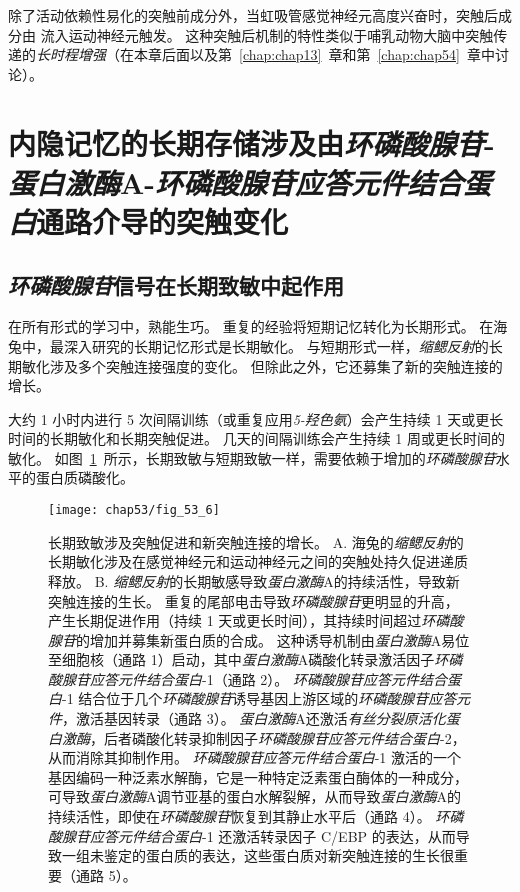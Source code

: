 除了活动依赖性易化的突触前成分外，当虹吸管感觉神经元高度兴奋时，突触后成分由  流入运动神经元触发。
这种突触后机制的特性类似于哺乳动物大脑中突触传递的\textit{长时程增强}（在本章后面以及第~\ref{chap:chap13}~章和第~\ref{chap:chap54}~章中讨论）。



\section{内隐记忆的长期存储涉及由\textit{环磷酸腺苷}-\textit{蛋白激酶}A-\textit{环磷酸腺苷应答元件结合蛋白}通路介导的突触变化}

\subsection{\textit{环磷酸腺苷}信号在长期致敏中起作用}

在所有形式的学习中，熟能生巧。
重复的经验将短期记忆转化为长期形式。
在海兔中，最深入研究的长期记忆形式是长期敏化。
与短期形式一样，\textit{缩鳃反射}的长期敏化涉及多个突触连接强度的变化。
但除此之外，它还募集了新的突触连接的增长。


大约 1 小时内进行 5 次间隔训练（或重复应用\textit{5-羟色氨}）会产生持续 1 天或更长时间的长期敏化和长期突触促进。
几天的间隔训练会产生持续 1 周或更长时间的敏化。
如图~\ref{fig:53_6}~所示，长期致敏与短期致敏一样，需要依赖于增加的\textit{环磷酸腺苷}水平的蛋白质磷酸化。


\begin{figure}[htbp]
	\centering
	\texttt{[image: chap53/fig\_53\_6]}
	\caption{长期致敏涉及突触促进和新突触连接的增长。
		A. 海兔的\textit{缩鳃反射}的长期敏化涉及在感觉神经元和运动神经元之间的突触处持久促进递质释放。
		B. \textit{缩鳃反射}的长期敏感导致\textit{蛋白激酶}A的持续活性，导致新突触连接的生长。
		重复的尾部电击导致\textit{环磷酸腺苷}更明显的升高，产生长期促进作用（持续 1 天或更长时间），其持续时间超过\textit{环磷酸腺苷}的增加并募集新蛋白质的合成。
		这种诱导机制由\textit{蛋白激酶}A易位至细胞核（通路 1）启动，其中\textit{蛋白激酶}A磷酸化转录激活因子\textit{环磷酸腺苷应答元件结合蛋白}-1（通路 2）。
		\textit{环磷酸腺苷应答元件结合蛋白}-1 结合位于几个\textit{环磷酸腺苷}诱导基因上游区域的\textit{环磷酸腺苷应答元件}，激活基因转录（通路 3）。
		\textit{蛋白激酶}A还激活\textit{有丝分裂原活化蛋白激酶}，后者磷酸化转录抑制因子\textit{环磷酸腺苷应答元件结合蛋白}-2，从而消除其抑制作用。
		\textit{环磷酸腺苷应答元件结合蛋白}-1 激活的一个基因编码一种泛素水解酶，它是一种特定泛素蛋白酶体的一种成分，可导致\textit{蛋白激酶}A调节亚基的蛋白水解裂解，从而导致\textit{蛋白激酶}A的持续活性，即使在\textit{环磷酸腺苷}恢复到其静止水平后（通路 4）。
		\textit{环磷酸腺苷应答元件结合蛋白}-1 还激活转录因子 C/EBP 的表达，从而导致一组未鉴定的蛋白质的表达，这些蛋白质对新突触连接的生长很重要（通路 5）。}
	\label{fig:53_6}
\end{figure}


